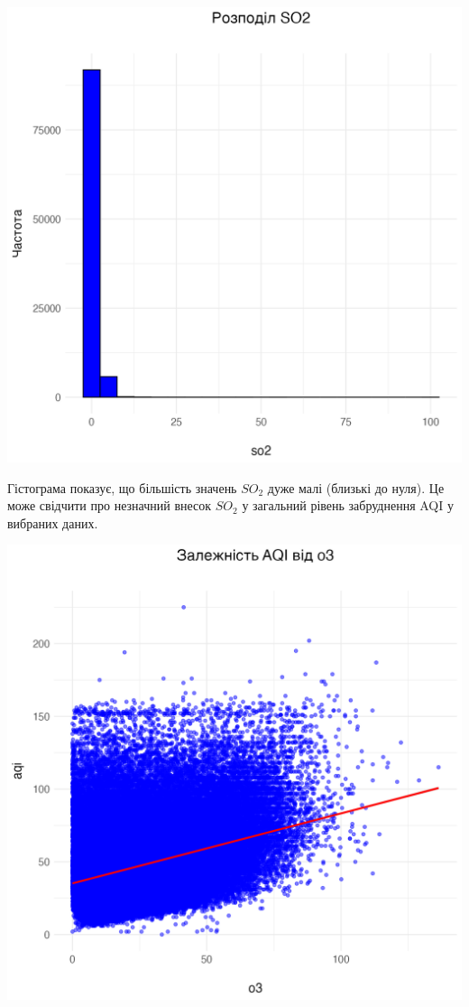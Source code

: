 \documentclass{article}
\begin{document}
\begin{enumerate}
    \includegraphics[width=6in]{question2/so2_plot.png}
    
    Гістограма показує, що більшість значень $SO_2$ дуже малі (близькі до нуля).
    Це може свідчити про незначний внесок $SO_2$ у загальний рівень забруднення AQI у вибраних даних.   
    
    \includegraphics[width=6in]{question2/scatter_plot.png}
    

\end{enumerate}
\end{document}
